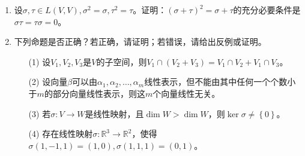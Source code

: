 \begin{enumerate}
    \item 设\(\sigma,\tau \in L(V,V),\sigma^2 = \sigma,\tau^2 = \tau\)。证明：\((\sigma + \tau)^2 = \sigma + \tau\)的充分必要条件是\(\sigma\tau = \tau\sigma = 0\)。

    \item 下列命题是否正确？若正确，请证明；若错误，请给出反例或证明。
          \begin{enumerate}
              \item[(1)] 设\(V_1,V_2,V_3\)是\(V\)的子空间，则\(V_1 \cap \left( V_2 + V_3 \right) = V_1 \cap V_2 + V_1 \cap V_3\)。
              \item[(2)] 设向量\(\beta\)可以由\(\alpha_1,\alpha_2,\ldots,\alpha_{m}\)线性表示，但不能由其中任何一个个数小于\(m\)的部分向量线性表示，则这\(m\)个向量线性无关。
              \item[(3)] 若\(\sigma:V \rightarrow W\)是线性映射，且\(\dim W > \dim W\)，则\(\ker\sigma \neq \left\{ 0 \right\}\)。
              \item[(4)] 存在线性映射\(\sigma:\mathbb{R}^3 \rightarrow \mathbb{R}^2\)，使得\(\sigma(1, - 1,1) = (1,0),\sigma(1,1,1) = (0,1)\)。
          \end{enumerate}
\end{enumerate}

\clearpage
